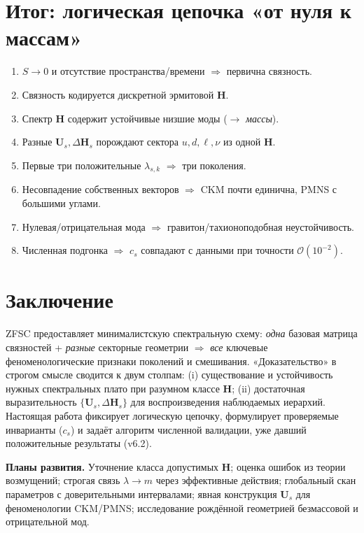 \documentclass[12pt,a4paper]{article}
\theoremstyle{definition}
\theoremstyle{plain}
\theoremstyle{remark}
\newcommand{\Hbase}{\mathbf{H}}
\newcommand{\Hs}{\mathbf{H}_{s}}
\newcommand{\U}{\mathbf{U}}
\begin{document}
\section{Итог: логическая цепочка «от нуля к массам»}
\begin{enumerate}[leftmargin=1.2cm]
  \item \(S\to 0\) и отсутствие пространства/времени \(\Rightarrow\) первична связность.
  \item Связность кодируется дискретной эрмитовой \(\Hbase\).
  \item Спектр \(\Hbase\) содержит устойчивые низшие моды (\(\to\) \emph{массы}).
  \item Разные \(\U_s,\Delta\Hs\) порождают сектора \(u,d,\ell,\nu\) из одной \(\Hbase\).
  \item Первые три положительные \(\lambda_{s,k}\) \(\Rightarrow\) три поколения.
  \item Несовпадение собственных векторов \(\Rightarrow\) CKM почти единична, PMNS с большими углами.
  \item Нулевая/отрицательная мода \(\Rightarrow\) гравитон/тахионоподобная неустойчивость.
  \item Численная подгонка \(\Rightarrow\) \(c_s\) совпадают с данными при точности \(\mathcal{O}(10^{-2})\).
\end{enumerate}

\section*{Заключение}
ZFSC предоставляет минималистскую спектральную схему: \emph{одна} базовая матрица связностей + \emph{разные} секторные геометрии \(\Rightarrow\) \emph{все} ключевые феноменологические признаки поколений и смешивания. «Доказательство» в строгом смысле сводится к двум столпам: (i) существование и устойчивость нужных спектральных плато при разумном классе \(\Hbase\); (ii) достаточная выразительность \(\{\U_s,\Delta\Hs\}\) для воспроизведения наблюдаемых иерархий. Настоящая работа фиксирует логическую цепочку, формулирует проверяемые инварианты (\(c_s\)) и задаёт алгоритм численной валидации, уже давший положительные результаты (v6.2).

\vspace{0.5em}
\noindent\textbf{Планы развития.} Уточнение класса допустимых \(\Hbase\); оценка ошибок из теории возмущений; строгая связь \(\lambda\to m\) через эффективные действия; глобальный скан параметров с доверительными интервалами; явная конструкция \(\U_s\) для феноменологии CKM/PMNS; исследование рождённой геометрией безмассовой и отрицательной мод.
\end{document}
